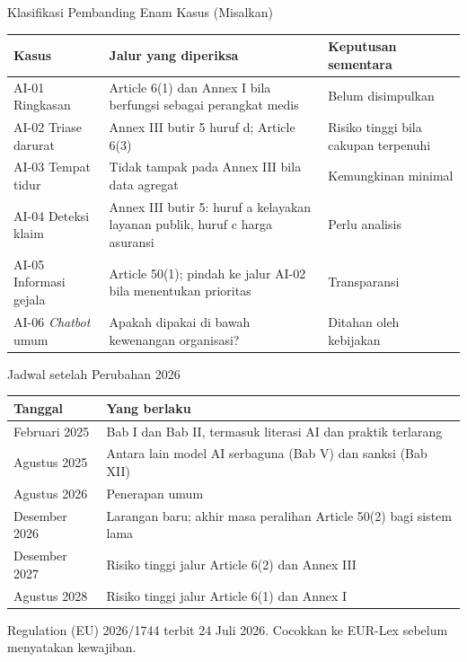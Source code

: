 \documentclass[aspectratio=169, table, 12pt]{beamer}
\begin{document}
\begin{frame}{{\Large Klasifikasi Pembanding Enam Kasus (Misalkan)}}
  \vspace{2pt}
  \scriptsize
  \begin{tabularx}{\textwidth}{|>{\raggedright\arraybackslash}p{}|>{\raggedright\arraybackslash}X|>{\raggedright\arraybackslash}p{}|}
    \hline
    \textbf{Kasus} & \textbf{Jalur yang diperiksa} & \textbf{Keputusan sementara} \\ \hline
    AI-01 Ringkasan & Article 6(1) dan Annex I bila berfungsi sebagai perangkat medis & Belum
    disimpulkan \\ \hline
    AI-02 Triase darurat & Annex III butir 5 huruf d; Article 6(3) & Risiko tinggi bila cakupan
    terpenuhi \\ \hline
    AI-03 Tempat tidur & Tidak tampak pada Annex III bila data agregat & Kemungkinan minimal \\
    \hline
    AI-04 Deteksi klaim & Annex III butir 5: huruf a kelayakan layanan publik, huruf c harga
    asuransi & Perlu analisis \\ \hline
    AI-05 Informasi gejala & Article 50(1); pindah ke jalur AI-02 bila menentukan prioritas &
    Transparansi \\ \hline
    AI-06 \textit{Chatbot} umum & Apakah dipakai di bawah kewenangan organisasi? & Ditahan oleh
    kebijakan \\ \hline
  \end{tabularx}
\end{frame}

\begin{frame}{{\Large Jadwal setelah Perubahan 2026}}
  \vspace{2pt}
  \footnotesize
  \begin{tabularx}{\textwidth}{|>{\raggedright\arraybackslash}p{}|>{\raggedright\arraybackslash}X|}
    \hline
    \textbf{Tanggal} & \textbf{Yang berlaku} \\ \hline
    2 Februari 2025 & Bab I dan Bab II, termasuk literasi AI dan praktik terlarang \\ \hline
    2 Agustus 2025 & Antara lain model AI serbaguna (Bab V) dan sanksi (Bab XII) \\ \hline
    2 Agustus 2026 & Penerapan umum \\ \hline
    2 Desember 2026 & Larangan baru; akhir masa peralihan Article 50(2) bagi sistem lama \\ \hline
    2 Desember 2027 & Risiko tinggi jalur Article 6(2) dan Annex III \\ \hline
    2 Agustus 2028 & Risiko tinggi jalur Article 6(1) dan Annex I \\ \hline
  \end{tabularx}

  \vspace{6pt}
  \small Regulation (EU) 2026/1744 terbit 24 Juli 2026. Cocokkan ke EUR-Lex sebelum menyatakan
  kewajiban.
\end{frame}
\end{document}
